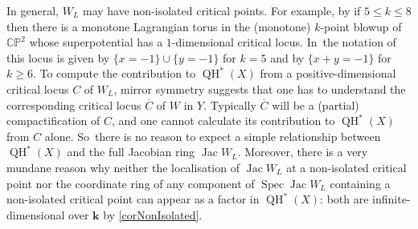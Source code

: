 \documentclass[JEP,XML,SOM,Unicode,NoEqCountersInSection,NoFloatCountersInSection,published]{cedram}
\theoremstyle{definition}
\newcommand{\CC}{\mathbb{C}}
\newcommand{\PP}{\mathbb{P}}
\newcommand{\kk}{{\boldsymbol{k}}}
\newcommand{\Spec}{\operatorname{Spec}}
\newcommand{\QH}{\operatorname{QH}}
\newcommand{\Jac}{\operatorname{Jac}}
\begin{document}
In general, $W_L$ may have non-isolated critical points. For example, by \cite[Prop.\,4.22]{PascaleffTonkonog} if $5 \leq k \leq 8$ then there is a monotone Lagrangian torus in the (monotone) $k$-point blowup of $\CC\PP^2$ whose superpotential has a $1$-dimensional critical locus. In~the notation of \cite[Table\,1]{PascaleffTonkonog} this locus is given by $\{x=-1\} \cup \{y=-1\}$ for $k=5$ and by $\{x+y = -1\}$ for $k \geq 6$. To compute the contribution to $\QH^*(X)$ from a positive-dimensional critical locus $C$ of $W_L$, mirror symmetry suggests that one has to understand the corresponding critical locus $\overline{C}$ of $W$ in $Y$. Typically $\overline{C}$ will be a (partial) compactification of $C$, and one cannot calculate its contribution to $\QH^*(X)$ from $C$ alone. So~there is no reason to expect a simple relationship between $\QH^*(X)$ and the full Jacobian ring $\Jac W_L$. Moreover, there is a very mundane reason why neither the localisation of $\Jac W_L$ at a non-isolated critical point nor the coordinate ring of any component of $\Spec \Jac W_L$ containing a non-isolated critical point can appear as a factor in $\QH^*(X)$: both are infinite-dimensional over $\kk$ by \cref{corNonIsolated}.
\end{document}

